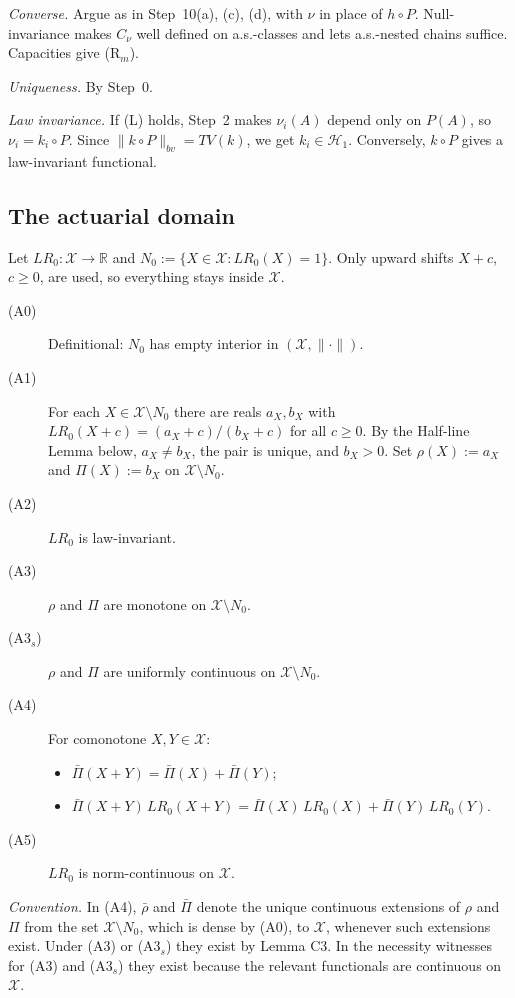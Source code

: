 \emph{Converse.} Argue as in Step~10(a), (c), (d), with $\nu$ in place of $h\circ P$. Null-invariance makes $C_\nu$ well defined on a.s.-classes and lets a.s.-nested chains suffice. Capacities give (R$_m$).

\emph{Uniqueness.} By Step~0.

\emph{Law invariance.} If (L) holds, Step~2 makes $\nu_i(A)$ depend only on $P(A)$, so $\nu_i=k_i\circ P$. Since $\|k\circ P\|_{bv}=TV(k)$, we get $k_i\in\mathcal H_1$. Conversely, $k\circ P$ gives a law-invariant functional.

\subsection{The actuarial domain}

Let $LR_0:\mathcal X\to\mathbb R$ and $N_0:=\{X\in\mathcal X:LR_0(X)=1\}$. Only upward shifts $X+c$, $c\ge0$, are used, so everything stays inside $\mathcal X$.

\begin{definition}
\begin{description}
\item[(A0)] Definitional: $N_0$ has empty interior in $(\mathcal X,\|\cdot\|)$.
\item[(A1)] For each $X\in\mathcal X\setminus N_0$ there are reals $a_X,b_X$ with $LR_0(X+c)=(a_X+c)/(b_X+c)$ for all $c\ge0$. By the Half-line Lemma below, $a_X\neq b_X$, the pair is unique, and $b_X>0$. Set $\rho(X):=a_X$ and $\Pi(X):=b_X$ on $\mathcal X\setminus N_0$.
\item[(A2)] $LR_0$ is law-invariant.
\item[(A3)] $\rho$ and $\Pi$ are monotone on $\mathcal X\setminus N_0$.
\item[(A3$_s$)] $\rho$ and $\Pi$ are uniformly continuous on $\mathcal X\setminus N_0$.
\item[(A4)] For comonotone $X,Y\in\mathcal X$:
  \begin{itemize}
  \item[(A4a)] $\bar\Pi(X+Y)=\bar\Pi(X)+\bar\Pi(Y)$;
  \item[(A4b)] $\bar\Pi(X+Y)\,LR_0(X+Y)=\bar\Pi(X)\,LR_0(X)+\bar\Pi(Y)\,LR_0(Y)$.
  \end{itemize}
\item[(A5)] $LR_0$ is norm-continuous on $\mathcal X$.
\end{description}
\emph{Convention.} In (A4), $\bar\rho$ and $\bar\Pi$ denote the unique continuous extensions of $\rho$ and $\Pi$ from the set $\mathcal X\setminus N_0$, which is dense by (A0), to $\mathcal X$, whenever such extensions exist. Under (A3) or (A3$_s$) they exist by Lemma C3. In the necessity witnesses for (A3) and (A3$_s$) they exist because the relevant functionals are continuous on $\mathcal X$.
\end{definition}

